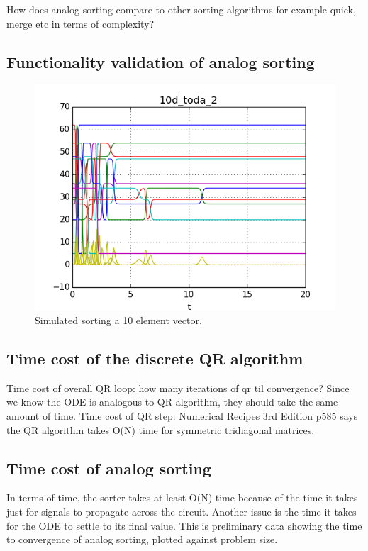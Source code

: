 How does analog sorting compare to other sorting algorithms for example quick, merge etc in terms of complexity?

\subsection{Functionality validation of analog sorting}
\begin{figure}
\centering
\includegraphics[width=\columnwidth]{../pyscripts/Graphs/10d_toda_2.png}
\caption{Simulated sorting a 10 element vector.}
\end{figure}

\subsection{Time cost of the discrete QR algorithm}
Time cost of overall QR loop:
	how many iterations of qr til convergence?
	Since we know the ODE is analogous to QR algorithm, they should take the same amount of time.
Time cost of QR step:
	Numerical Recipes 3rd Edition p585 says the QR algorithm takes O(N) time for symmetric tridiagonal matrices.

\subsection{Time cost of analog sorting}

In terms of time, the sorter takes at least O(N) time because of the time it takes just for signals to propagate across the circuit.
Another issue is the time it takes for the ODE to settle to its final value.
This is preliminary data showing the time to convergence of analog sorting, plotted against problem size.

